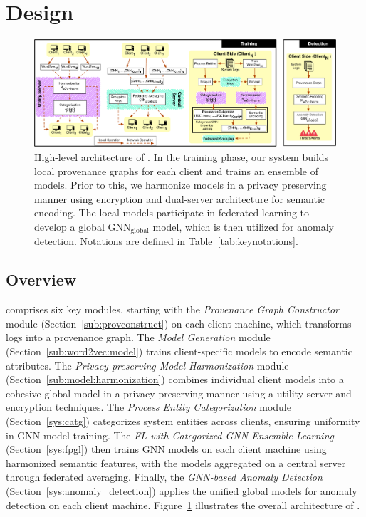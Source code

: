 \section{Design}
\label{sec:methodology}



\begin{figure}[t!]
  \centering
  \includegraphics[width=1\textwidth]{fig/archv7.pdf}
  \caption{High-level architecture of \Sys. In the training phase, our system builds local provenance graphs for each client and trains an ensemble of \gnnshort models. Prior to this, we harmonize \wordvec models in a privacy preserving manner using encryption and dual-server architecture for semantic encoding. The local \gnnshort models participate in federated learning to develop a global \( {\text{GNN}}_{\text{global}} \) model, which is then utilized for anomaly detection. Notations are defined in Table~\ref{tab:keynotations}.}
  \vspace{-3ex}
  \label{fig:arch}
\end{figure}


\subsection{Overview}
\Sys comprises six key modules, starting with the \textit{Provenance Graph Constructor} module (Section~\ref{sub:provconstruct}) on each client machine, which transforms logs into a provenance graph. The \textit{\wordvec Model Generation} module (Section~\ref{sub:word2vec:model}) trains client-specific \wordvec models to encode semantic attributes.
The \textit{Privacy-preserving \wordvec Model Harmonization} module (Section~\ref{sub:model:harmonization}) combines individual client \wordvec models into a cohesive global model in a privacy-preserving manner using a utility server and encryption techniques. The \textit{Process Entity Categorization} module (Section~\ref{sys:catg}) categorizes system entities across clients, ensuring uniformity in GNN model training. The \textit{FL with Categorized GNN Ensemble Learning} (Section~\ref{sys:fpgl}) then trains GNN models on each client machine using harmonized semantic features, with the models aggregated on a central server through federated averaging. Finally, the \textit{GNN-based Anomaly Detection} (Section~\ref{sys:anomaly_detection}) applies the unified global models for anomaly detection on each client machine. Figure~\ref{fig:arch} illustrates the overall architecture of \Sys.

